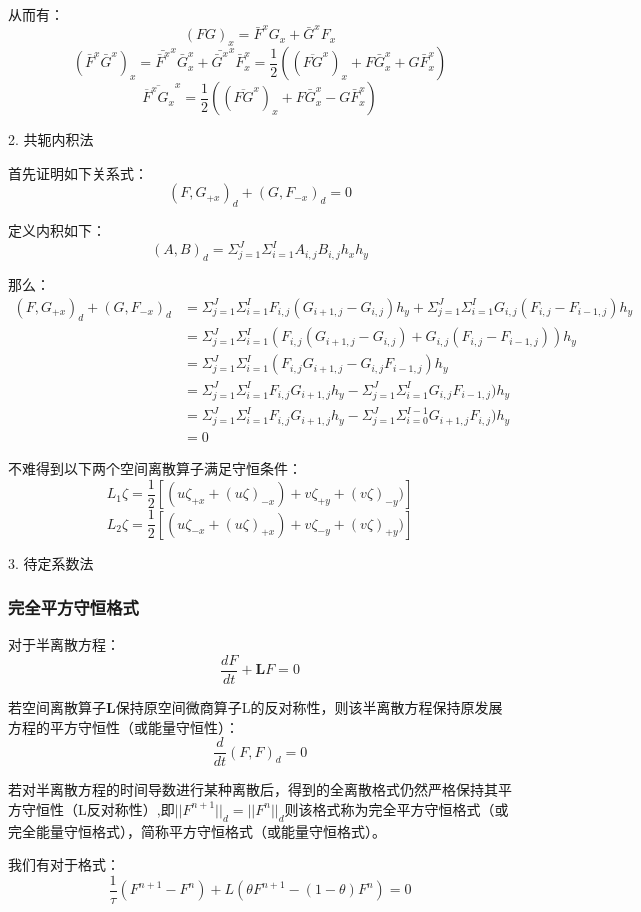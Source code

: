 \documentclass{article}
\begin{document}
从而有：
$$(FG)_x = \bar{F}^xG_x + \bar{G}^xF_x$$
$$(\bar{F}^x\bar{G}^x)_x = \bar{\bar{F}^x}^x\bar{G}^x_x + \bar{\bar{G}^x}^x\bar{F}^x_x = \frac{1}{2}((\overline{FG}^x)_x+F\bar{G}^x_x+G\bar{F}^x_x)$$
$$\overline{\overline{F}^xG_x}^x=\frac{1}{2}((\overline{FG}^x)_x+F\bar{G}^x_x-G\bar{F}^x_x)$$

2. 共轭内积法

首先证明如下关系式：
$$(F,G_{+x})_d + (G, F_{-x})_d = 0$$

定义内积如下：
$$(A,B)_d= \Sigma_{j=1}^{J}\Sigma_{i=1}^{I}A_{i,j}B_{i,j}h_xh_y$$

那么：
\begin{align}
    (F,G_{+x})_d + (G, F_{-x})_d &= \Sigma_{j=1}^{J}\Sigma_{i=1}^{I}F_{i,j}(G_{i+1,j}-G_{i,j})h_y + \Sigma_{j=1}^{J}\Sigma_{i=1}^{I}G_{i,j}(F_{i,j}-F_{i-1,j})h_y\\
    & = \Sigma_{j=1}^{J}\Sigma_{i=1}^{I}(F_{i,j}(G_{i+1,j}-G_{i,j}) + G_{i,j}(F_{i,j}-F_{i-1,j}))h_y\\
    & = \Sigma_{j=1}^{J}\Sigma_{i=1}^{I}(F_{i,j}G_{i+1,j} - G_{i,j}F_{i-1,j})h_y\\
    & = \Sigma_{j=1}^{J}\Sigma_{i=1}^{I}F_{i,j}G_{i+1,j}h_y - \Sigma_{j=1}^{J}\Sigma_{i=1}^{I}G_{i,j}F_{i-1,j})h_y\\
    & = \Sigma_{j=1}^{J}\Sigma_{i=1}^{I}F_{i,j}G_{i+1,j}h_y - \Sigma_{j=1}^{J}\Sigma_{i=0}^{I-1}G_{i+1,j}F_{i,j})h_y\\
    & = 0
\end{align}

不难得到以下两个空间离散算子满足守恒条件：
$$L_1\zeta = \frac{1}{2}[(u\zeta_{+x}+(u\zeta)_{-x})+v\zeta_{+y}+(v\zeta)_{-y})]$$
$$L_2\zeta = \frac{1}{2}[(u\zeta_{-x}+(u\zeta)_{+x})+v\zeta_{-y}+(v\zeta)_{+y})]$$

3. 待定系数法


\subsubsection{完全平方守恒格式}
对于半离散方程：
$$\frac{d F}{d t} + \mathbf{L}F = 0$$

若空间离散算子$\mathbf{L}$保持原空间微商算子L的反对称性，则该半离散方程保持原发展方程的平方守恒性（或能量守恒性）：
$$\frac{d}{dt}(F,F)_d = 0$$

若对半离散方程的时间导数进行某种离散后，得到的全离散格式仍然严格保持其平方守恒性（L反对称性）,即$||F^{n+1}||_d = ||F^n||_d$则该格式称为完全平方守恒格式（或完全能量守恒格式），简称平方守恒格式（或能量守恒格式）。

我们有对于格式：
$$\frac{1}{\tau}(F^{n+1}-F^n)+L(\theta F^{n+1} - (1-\theta) F^n)=0$$
\end{document}
